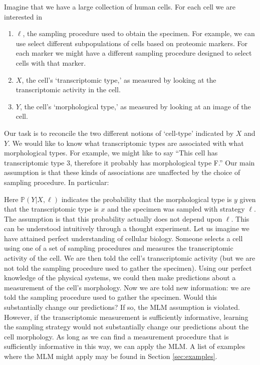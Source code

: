 Imagine that we have a large collection of human cells.  For each cell we are interested in 
%
\begin{enumerate}
    \item $\ell$, the sampling procedure used to obtain the specimen.  For example, we can use select different subpopulations of cells based on proteomic markers.  For each marker we might have a different sampling procedure designed to select cells with that marker.
    \item $X$, the cell's `transcriptomic type,' as measured by looking at the transcriptomic activity in the cell.  
    \item $Y$, the cell's `morphological type,' as measured by looking at an image of the cell.
\end{enumerate}
%
Our task is to reconcile the two different notions of `cell-type' indicated by $X$ and $Y$.  We would like to know what transcriptomic types are associated with what morphological types.  For example, we might like to say ``This cell has transcriptomic type 3, therefore it probably has morphological type F.''  Our main assumption is that these kinds of associations are unaffected by the choice of sampling procedure.  In particular:

\begin{center}
\end{center}

Here $\mathbb{P}(Y|X,\ell)$ indicates the probability that the morphological type is $y$ given that the transcriptomic type is $x$ and the specimen was sampled with strategy $\ell$.  The assumption is that this probability actually does not depend upon $\ell$.  This can be understood intuitively through a thought experiment.  Let us imagine we have attained perfect understanding of cellular biology.  Someone selects a cell using one of a set of sampling procedures and measures the transcriptomic activity of the cell.  We are then told the cell's transcriptomic activity (but we are not told the sampling procedure used to gather the specimen).  Using our perfect knowledge of the physical systems, we could then make predictions about a measurement of the cell's morphology.  Now we are told new information: we are told the sampling procedure used to gather the specimen.  Would this substantially change our predictions?  If so, the MLM assumption is violated.  However, if the transcriptomic measurement is sufficiently informative, learning the sampling strategy would not substantially change our predictions about the cell morphology.  As long as we can find a measurement procedure that is sufficiently informative in this way, we can apply the MLM.  A list of examples where the MLM might apply may be found in Section \ref{sec:examples}.

